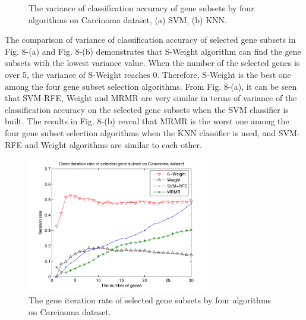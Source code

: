 \documentclass[runningheads,a4paper]{llncs}
\begin{document}
\begin{figure}[t]
\centering
{}
\hspace{0.5cm}
\caption{The variance of classification accuracy of gene subsets by four algorithms on Carcinoma dataset, (a) SVM, (b) KNN.}
\label{fig:fig8}
\end{figure}


The comparison of variance of classification accuracy of selected gene subsets in Fig. 8-(a) and Fig. 8-(b) demonstrates that S-Weight algorithm can find the gene subsets with the lowest variance value. When the number of the selected genes is over 5, the variance of S-Weight reaches 0. Therefore, S-Weight is the best one among the four gene subset selection algorithms. From Fig. 8-(a), it can be seen that SVM-RFE, Weight and MRMR are very similar in terms of variance of the classification accuracy on the selected gene subsets when the SVM classifier is built. The results in Fig. 8-(b) reveal that MRMR is the worst one among the four gene subset selection algorithms when the KNN classifier is used, and SVM-RFE and Weight algorithms are similar to each other.


\begin{figure}
\centering    
\includegraphics[width=8cm]{fig9.pdf}
\caption{The gene iteration rate of selected gene subsets by four algorithms on Carcinoma dataset. }     
\label{fig:fig9}     
\end{figure}
\end{document}
